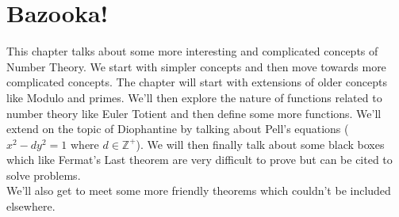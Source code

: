 \chapter{Bazooka!}
This chapter talks about some more interesting and complicated concepts of Number Theory. We start with simpler concepts and then move towards more complicated concepts. The chapter will start with extensions of older concepts like Modulo and primes. We'll then explore the nature of functions related to number theory like Euler Totient and then define some more functions. We'll extend on the topic of Diophantine by talking about Pell's equations ($x^2-dy^2=1$ where $d \in \mathbb{Z^+}$). We will then finally talk about some black boxes which like Fermat's Last theorem are very difficult to prove but can be cited to solve problems.\\
We'll also get to meet some more friendly theorems which couldn't be included elsewhere.\\
